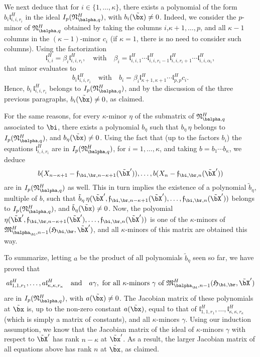 \documentclass[12pt]{article}
\begin{document}
We next deduce that for $i\in\{1,\dots,\kappa\}$, there exists a
polynomial of the form $b_{i} \mathfrak{l}^H_{i,i,r_i}$ in the ideal
$I_p(\mathfrak{N}^H_{\balpha,q})$, with $b_{i}(\tilde\bx)\ne
0$. Indeed, we consider the $p$-minor of $\mathfrak{N}^H_{\balpha,q}$
obtained by taking the columns $i$,$\kappa+1,\dots,p$, and all
$\kappa-1$ columns in the $(\kappa-1)$-minor $c_i$ (if $\kappa=1$,
there is no need to consider such columns). Using the factorization
$$\mathfrak{l}^H_{i,i} = \beta_i \mathfrak{l}^H_{i,i,r_i},\quad\text{with}\quad
\beta_i=\mathfrak{l}^H_{i,i,1}\cdots \mathfrak{l}^H_{i,i,r_i-1}\mathfrak{l}^H_{i,i,r_i+1}\cdots \mathfrak{l}^H_{i,i,\alpha_i},$$
that minor evaluates to 
$$b_i \mathfrak{l}^H_{i,i,r_i}\quad\text{with}\quad b_i = \beta_i
\mathfrak{l}^H_{\kappa+1,\kappa+1}\cdots \mathfrak{l}^H_{p,p}c_i.$$ Hence, $b_i\,
\mathfrak{l}^H_{i,i,r_i}$ belongs to $I_p(\mathfrak{N}^H_{\balpha,q})$, and by
the discussion of the three previous paragraphs, $b_i(\tilde\bx)\ne 0$,
as claimed.

For the same reasons, for every $\kappa$-minor $\eta$ of the submatrix of
$\mathfrak{N}^H_{\balpha,q}$ associated to $\bi$, there exists a
polynomial $b_\eta$ such that $b_\eta\, \eta$ belongs to
$I_p(\mathfrak{N}^H_{\balpha,q})$, and $b_\eta(\tilde\bx)\ne 0$.  Using
the fact that (up to the factors $b_i$) the equations
$\mathfrak{l}^H_{i,i,r_i}$ are in $I_p(\mathfrak{N}^H_{\balpha,q})$, 
for $i=1,\dots,\kappa$, and taking $b=b_1 \cdots b_\kappa$, we
deduce 
$$
b(X_{n-\kappa+1}-\mathfrak{f}_{\bi,\br,n-\kappa+1}(\tilde\bX')),\dots,b(X_{n}-\mathfrak{f}_{\bi,\br,n}(\tilde\bX'))
$$ are in $I_p(\mathfrak{N}^H_{\balpha,q})$ as well. This in turn
implies the existence of a polynomial $\tilde b_\eta$, multiple of $b$, such that $\tilde
b_\eta\,
\eta(\tilde\bX',\mathfrak{f}_{\bi,\br,n-\kappa+1}(\tilde\bX'),\dots,\mathfrak{f}_{\bi,\br,n}(\tilde\bX'))$
belongs to $I_p(\mathfrak{N}^H_{\balpha,q})$, and $\tilde
b_\eta(\tilde\bx)\ne 0$. Now, the polyomial
$\eta(\tilde\bX',\mathfrak{f}_{\bi,\br,n-\kappa+1}(\tilde\bX'),\dots,\mathfrak{f}_{\bi,\br,n}(\tilde\bX'))$
is one of the $\kappa$-minors of
$\mathfrak{M}^H_{\balpha_\bi,n-1}(\mathfrak{H}_{\bi,\br},\tilde\bX')$,
and all $\kappa$-minors of this matrix are obtained this way.

To summarize, letting $a$ be the product of all polynomials $\tilde
b_\eta$ seen so far, we have proved that 
$$a \mathfrak{l}^H_{1,1,r_1},\dots,a
\mathfrak{l}^H_{\kappa,\kappa,r_\kappa} \quad\text{and}\quad a \gamma,
\text{~for all $\kappa$-minors $\gamma$ of
  $\mathfrak{M}^H_{\balpha_\bi,n-1}(\mathfrak{H}_{\bi,\br},\tilde\bX')$}$$
are in $I_p(\mathfrak{N}^H_{\balpha,q})$, with $a(\tilde\bx) \ne
0$. The Jacobian matrix of these polynomials at $\tilde\bx$ is, up to
the non-zero constant $a(\tilde\bx)$, equal to that of
$\mathfrak{l}^H_{1,1,r_1},\dots,
\mathfrak{l}^H_{\kappa,\kappa,r_\kappa}$ (which is simply 
a matrix of constants), and all $\kappa$-minors
$\gamma$. Using our induction assumption, we know that the Jacobian
matrix of the ideal of $\kappa$-minors $\gamma$ with respect to
$\tilde\bX'$ has rank $n-\kappa$ at $\tilde\bx'$. As a result, 
the larger Jacobian matrix of all equations above 
has rank $n$ at $\tilde\bx$, as claimed.
\end{document}
